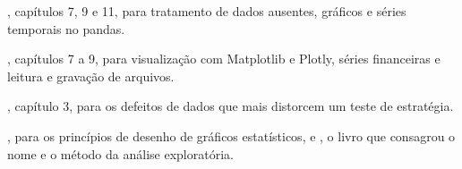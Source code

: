 \begin{leituras}
  \item \citet{mckinney2022}, capítulos 7, 9 e 11, para tratamento de dados ausentes, gráficos e séries temporais no pandas.
  \item \citet{hilpisch2018}, capítulos 7 a 9, para visualização com Matplotlib e Plotly, séries financeiras e leitura e gravação de arquivos.
  \item \citet{chan2021}, capítulo 3, para os defeitos de dados que mais distorcem um teste de estratégia.
  \item \citet{tufte2001}, para os princípios de desenho de gráficos estatísticos, e \citet{tukey1977}, o livro que consagrou o nome e o método da análise exploratória.
\end{leituras}
